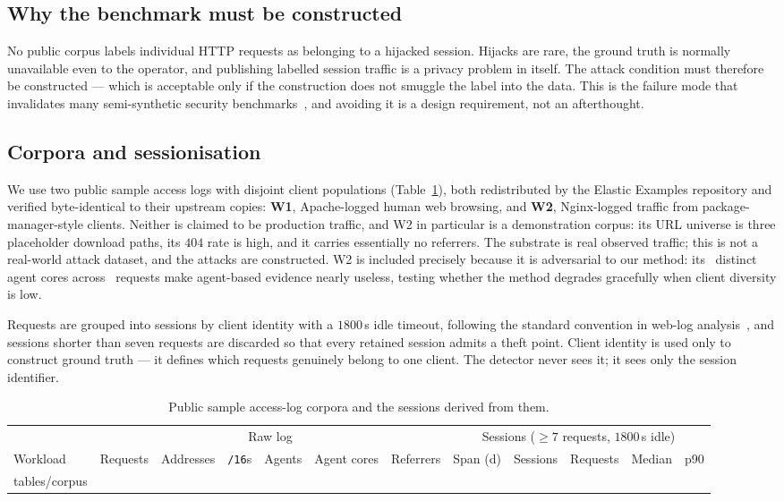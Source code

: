 \documentclass[conference]{IEEEtran}
\makeatletter
\newcommand{\tabbody}[1]{\@@input #1 }
\makeatother
\begin{document}
\subsection{Why the benchmark must be constructed}

No public corpus labels individual HTTP requests as belonging to a hijacked
session.  Hijacks are rare, the ground truth is normally unavailable even to the
operator, and publishing labelled session traffic is a privacy problem in
itself.  The attack condition must therefore be constructed --- which is
acceptable only if the construction does not smuggle the label into the data.
This is the failure mode that invalidates many semi-synthetic security
benchmarks~\cite{sommer2010closedworld,arp2022dosdonts,rossow2012prudent}, and
avoiding it is a design requirement, not an afterthought.

\subsection{Corpora and sessionisation}

We use two public sample access logs with disjoint client populations
(Table~\ref{tab:corpus}), both redistributed by the Elastic Examples repository
and verified byte-identical to their upstream copies: \textbf{W1}, Apache-logged
human web browsing, and \textbf{W2}, Nginx-logged traffic from
package-manager-style clients.  Neither is claimed to be production traffic, and
W2 in particular is a demonstration corpus: its URL universe is three placeholder
download paths, its $404$ rate is high, and it carries essentially no referrers.
The substrate is real observed traffic; this is not a real-world attack dataset,
and the attacks are constructed.
W2 is included precisely because it is adversarial to our method: its
\corpusCoresApt\ distinct agent cores across \corpusReqApt\ requests make
agent-based evidence nearly useless, testing whether the method degrades
gracefully when client diversity is low.

Requests are grouped into sessions by client identity with a $1800$\,s idle
timeout, following the standard convention in web-log
analysis~\cite{catledge1995browsing,cooley1999preparation}, and sessions shorter
than seven requests are discarded so that every retained session admits a theft
point.  Client identity is used only to construct ground truth --- it defines
which requests genuinely belong to one client.  The detector never sees it; it
sees only the session identifier.

\begin{table}[t]
\caption{Public sample access-log corpora and the sessions derived from them.}
\label{tab:corpus}
\centering\footnotesize
\begin{tabular}{lrrrrrrrrrrr}
\toprule
& \multicolumn{6}{c}{Raw log} & \multicolumn{5}{c}{Sessions ($\geq 7$ requests, $1800$\,s idle)}\\
\cmidrule(lr){2-7}\cmidrule(lr){8-12}
Workload & Requests & Addresses & \texttt{/16}s & Agents & Agent cores & Referrers & Span (d) & Sessions & Requests & Median & p90\\
\midrule
\tabbody{tables/corpus}
\bottomrule
\end{tabular}
\end{table}
\end{document}
